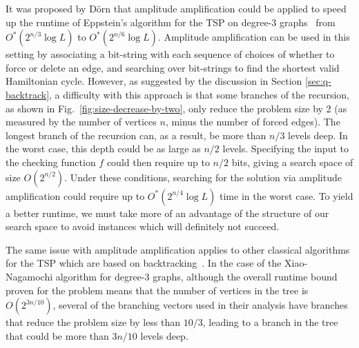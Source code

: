It was proposed by D\"orn \cite{dorn2007} that amplitude amplification could be applied to speed up the runtime of Eppstein's algorithm for the TSP on degree-3 graphs~\cite{eppstein2007} from $O^*(2^{n/3}\log L)$ to $O^*(2^{n/6}\log L)$. Amplitude amplification can be used in this setting by associating a bit-string with each sequence of choices of whether to force or delete an edge, and searching over bit-strings to find the shortest valid Hamiltonian cycle. However, as suggested by the discussion in Section \ref{sec:q-backtrack}, a difficulty with this approach is that some branches of the recursion, as shown in Fig.~\ref{fig:size-decrease-by-two}, only reduce the problem size by 2 (as measured by the number of vertices $n$, minus the number of forced edges). The longest branch of the recursion can, as a result, be more than $n/3$ levels deep. In the worst case, this depth could be as large as $n/2$ levels. Specifying the input to the checking function $f$ could then require up to $n/2$ bits, giving a search space of size $O(2^{n/2})$. Under these conditions, searching for the solution via amplitude amplification could require up to $O^*(2^{n/4}\log L)$ time in the worst case. To yield a better runtime, we must take more of an advantage of the structure of our search space to avoid instances which will definitely not succeed.

The same issue with amplitude amplification applies to other classical algorithms for the TSP which are based on backtracking~\cite{xiao2016degree3,xiao2016degree4}. In the case of the Xiao-Nagamochi algorithm for degree-3 graphs, although the overall runtime bound proven for the problem means that the number of vertices in the tree is $O(2^{3n/10})$, several of the branching vectors used in their analysis have branches that reduce the problem size by less than $10/3$, leading to a branch in the tree that could be more than $3n/10$ levels deep.

